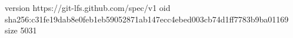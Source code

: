 version https://git-lfs.github.com/spec/v1
oid sha256:c31fe19dab8e0feb1eb59052871ab147ecc4ebed003cb74d1ff7783b9ba01169
size 5031
